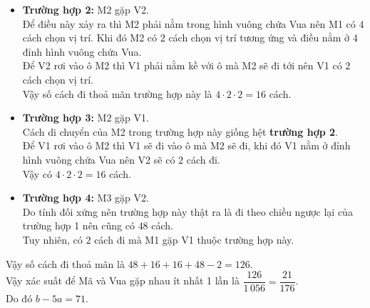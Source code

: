 \begin{ex}
{\begin{itemize}
			Vua đi sau mã nên V1 sẽ phải đi vào ô M1. Với mỗi vị trí của V1 thì có $4$ cách chọn ví trí cho V2.\\
			Vậy số cách đi thoả mãn trường hợp này là $12 \cdot 4 =48$ cách.
			\item \textbf{Trường hợp 2:} M2 gặp V2.\\
			Để điều này xảy ra thì M2 phải nằm trong hình vuông chứa Vua nên M1 có $4$ cách chọn vị trí. Khi đó M2 có $2$ cách chọn vị trí tương ứng và điều nằm ở $4$ đỉnh hình vuông chứa Vua.\\
			Để V2 rơi vào ô M2 thì V1 phải nằm kề với ô mà M2 sẽ đi tới nên V1 có $2$ cách chọn vị trí.\\
			Vậy số cách đi thoả mãn trường hợp này là $4 \cdot 2 \cdot 2 = 16$ cách.
			\item  \textbf{Trường hợp 3:} M2 gặp V1.\\
			Cách di chuyển của M2 trong trường hợp này giống hệt \textbf{trường hợp 2}.\\
			Để V1 rơi vào ô M2 thì V1 sẽ đi vào ô mà M2 sẽ đi, khi đó V1 nằm ở  đỉnh hình vuông chứa Vua nên V2 sẽ có $2$ cách đi. \\
			Vậy có $4 \cdot 2 \cdot 2 = 16$ cách.
			\item  \textbf{Trường hợp 4:} M3 gặp V2.\\
			Do tính đối xứng nên trường hợp này thật ra là đi theo chiều ngược lại của trường hợp 1 nên cũng có $48$ cách.\\
			Tuy nhiên, có $2$ cách đi mà M1 gặp V1 thuộc trường hợp này.
		\end{itemize}
		Vậy số cách đi thoả mãn là $48+16+16+48-2=126$.\\
		Vậy xác suất để Mã và Vua gặp nhau ít nhất 1 lần là $\dfrac{126}{1\,056} = \dfrac{21}{176}$.\\
		Do đó $b-5a = 71$.
	}
\end{ex}

